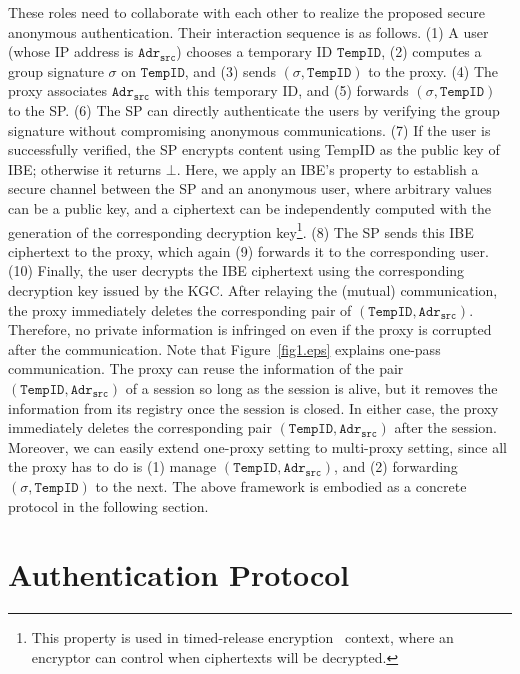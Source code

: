 \documentclass[preprint]{sig-alternate}
\begin{document}
These roles need to collaborate with each other to realize the proposed secure anonymous authentication.
Their interaction sequence is as follows.
(1) A user (whose IP address is $\mathtt{Adr_{src}}$) chooses a temporary ID $\mathtt{TempID}$, (2) computes a group signature $\sigma$ on $\mathtt{TempID}$, and (3) sends $(\sigma, \mathtt{TempID})$ to the proxy.
(4) The proxy associates $\mathtt{Adr_{src}}$ with this temporary ID, and (5) forwards $(\sigma, \mathtt{TempID})$ to the SP.
(6) The SP can directly authenticate the users by verifying the group signature without compromising anonymous communications.
(7) If the user is successfully verified, the SP encrypts content using TempID as the public key of IBE; otherwise it returns $\bot$.
Here, we apply an IBE's property to establish a secure channel between the SP and an anonymous user, where arbitrary values can be a public key, and a ciphertext can be independently computed with the generation of the corresponding decryption key\footnote{This property is used in timed-release encryption~\cite{[CheonHKO08]} context, where an encryptor can control when ciphertexts will be decrypted.}. 
(8) The SP sends this IBE ciphertext to the proxy, which again (9) forwards it to the corresponding user. (10) Finally, the user decrypts the IBE ciphertext using the corresponding decryption key issued by the KGC. 
After relaying the (mutual) communication, the proxy immediately deletes the corresponding pair of $(\mathtt{TempID}, \mathtt{Adr_{src}})$. 
Therefore, no private information is infringed on even if the proxy is corrupted after the communication. 
Note that Figure~\ref{fig1.eps} explains one-pass communication.
The proxy can reuse the information of the pair $(\mathtt{TempID}, \mathtt{Adr_{src}})$ of a session so long as the session is alive, but it removes the information from its registry once the session is closed. 
In either case, the proxy immediately deletes the corresponding pair $(\mathtt{TempID}, \mathtt{Adr_{src}})$ after the session.
Moreover, we can easily extend one-proxy setting to multi-proxy setting, since all the proxy has to do is (1) manage $(\mathtt{TempID}, \mathtt{Adr_{src}})$, and (2) forwarding $(\sigma, \mathtt{TempID})$ to the next. 
The above framework is embodied as a concrete protocol in the following section.




\section{Authentication Protocol}
\end{document}
